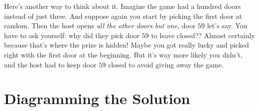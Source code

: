 \documentclass[justified]{tufte-book}
\theoremstyle{definition}
\theoremstyle{definition}
\theoremstyle{definition}
\theoremstyle{remark}
\begin{document}
Here's another way to think about it. Imagine the game had a hundred
doors instead of just three. And suppose again you start by picking the
first door at random. Then the host opens \emph{all the other doors but
one}, door \(59\) let's say. You have to ask yourself: why did they pick
door \(59\) to leave closed?? Almost certainly because that's where the
prize is hidden! Maybe you got really lucky and picked right with the
first door at the beginning. But it's way more likely you didn't, and
the host had to keep door \(59\) closed to avoid giving away the game.

\hypertarget{diagramming-the-solution}{%
\section{Diagramming the Solution}\label{diagramming-the-solution}}
\end{document}
